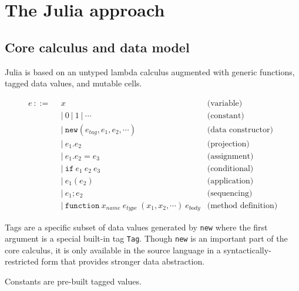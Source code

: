 \chapter{The Julia approach}

\section{Core calculus and data model}
\label{sec:corecalc}

Julia is based on an untyped lambda calculus augmented with generic functions,
tagged data values, and mutable cells.

\vspace{-3ex}
\begin{singlespace}
\begin{align*}
  e\ ::=\ &\ x                 & \textrm{(variable)} \\
        &\ |\ 0\ |\ 1\ |\ \cdots     & \textrm{(constant)} \\
        &\ |\ \texttt{new}(e_{tag}, e_1, e_2, \cdots) & \textrm{(data constructor)} \\
        &\ |\ e_1.e_2        & \textrm{(projection)} \\
        &\ |\ e_1.e_2 = e_3  & \textrm{(assignment)} \\
        &\ |\ \texttt{if}\ e_1\ e_2\ e_3 & \textrm{(conditional)} \\
        &\ |\ e_1(e_2)       & \textrm{(application)} \\
        &\ |\ e_1; e_2       & \textrm{(sequencing)} \\
        &\ |\ \texttt{function}\ x_{name}\ e_{type}\ (x_1, x_2, \cdots)\ e_{body} & \textrm{(method definition)}
\end{align*}
\end{singlespace}


Tags are a specific subset of data values generated by \texttt{new} where the
first argument is a special built-in tag \texttt{Tag}.
Though \texttt{new} is an important part of the core calculus, it is only
available in the source language in a syntactically-restricted form that
provides stronger data abstraction.



Constants are pre-built tagged values.

